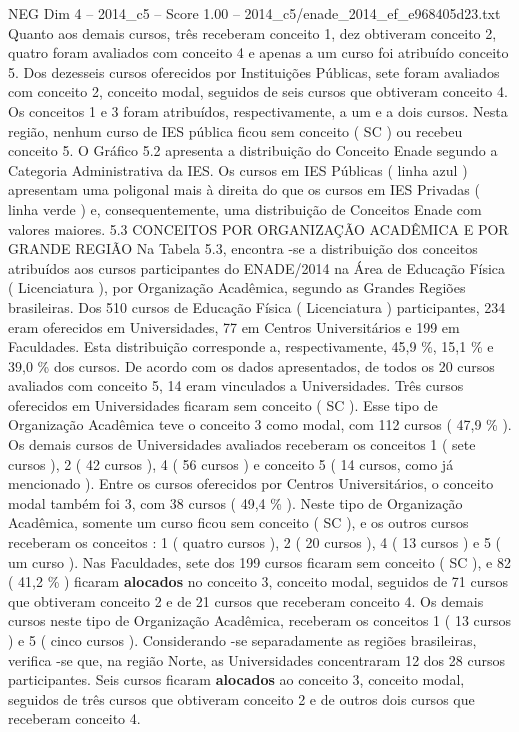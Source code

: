 \begin{textsample}{NEG Dim 4 – 2014\_c5 – Score 1.00 – 2014\_c5/enade\_2014\_ef\_e968405d23.txt}
Quanto aos demais cursos, três receberam conceito 1, dez obtiveram conceito 2, quatro foram avaliados com conceito 4 e apenas a um curso foi atribuído conceito 5.
Dos dezesseis cursos oferecidos por Instituições Públicas, sete foram avaliados com conceito 2, conceito modal, seguidos de seis cursos que obtiveram conceito 4.
Os conceitos 1 e 3 foram atribuídos, respectivamente, a um e a dois cursos.
Nesta região, nenhum curso de IES pública ficou sem conceito ( SC ) ou recebeu conceito 5.
O Gráfico 5.2 apresenta a distribuição do Conceito Enade segundo a Categoria Administrativa da IES.
Os cursos em IES Públicas ( linha azul ) apresentam uma poligonal mais à direita do que os cursos em IES Privadas ( linha verde ) e, consequentemente, uma distribuição de Conceitos Enade com valores maiores. 5.3 CONCEITOS POR ORGANIZAÇÃO ACADÊMICA E POR GRANDE REGIÃO Na Tabela 5.3, encontra -se a distribuição dos conceitos atribuídos aos cursos participantes do ENADE/2014 na Área de Educação Física ( Licenciatura ), por Organização Acadêmica, segundo as Grandes Regiões brasileiras.
Dos 510 cursos de Educação Física ( Licenciatura ) participantes, 234 eram oferecidos em Universidades, 77 em Centros Universitários e 199 em Faculdades.
Esta distribuição corresponde a, respectivamente, 45,9 \%, 15,1 \% e 39,0 \% dos cursos.
De acordo com os dados apresentados, de todos os 20 cursos avaliados com conceito 5, 14 eram vinculados a Universidades.
Três cursos oferecidos em Universidades ficaram sem conceito ( SC ).
Esse tipo de Organização Acadêmica teve o conceito 3 como modal, com 112 cursos ( 47,9 \% ).
Os demais cursos de Universidades avaliados receberam os conceitos 1 ( sete cursos ), 2 ( 42 cursos ), 4 ( 56 cursos ) e conceito 5 ( 14 cursos, como já mencionado ).
Entre os cursos oferecidos por Centros Universitários, o conceito modal também foi 3, com 38 cursos ( 49,4 \% ).
Neste tipo de Organização Acadêmica, somente um curso ficou sem conceito ( SC ), e os outros cursos receberam os conceitos : 1 ( quatro cursos ), 2 ( 20 cursos ), 4 ( 13 cursos ) e 5 ( um curso ).
Nas Faculdades, sete dos 199 cursos ficaram sem conceito ( SC ), e 82 ( 41,2 \% ) ficaram \textbf{alocados} no conceito 3, conceito modal, seguidos de 71 cursos que obtiveram conceito 2 e de 21 cursos que receberam conceito 4.
Os demais cursos neste tipo de Organização Acadêmica, receberam os conceitos 1 ( 13 cursos ) e 5 ( cinco cursos ).
Considerando -se separadamente as regiões brasileiras, verifica -se que, na região Norte, as Universidades concentraram 12 dos 28 cursos participantes.
Seis cursos ficaram \textbf{alocados} ao conceito 3, conceito modal, seguidos de três cursos que obtiveram conceito 2 e de outros dois cursos que receberam conceito 4.

\end{textsample}
